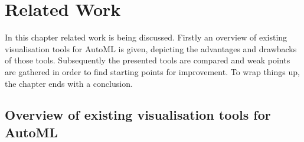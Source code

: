 %
\chapter{Related Work}
\label{sec:related}

In this chapter related work is being discussed. Firstly an overview of existing visualisation tools for AutoML is given, depicting the advantages and drawbacks of those tools. Subsequently the presented tools are compared and weak points are gathered in order to find starting points for improvement. To wrap things up, the chapter ends with a conclusion.

\section{Overview of existing visualisation tools for AutoML}
\label{sec:realted:overview}


